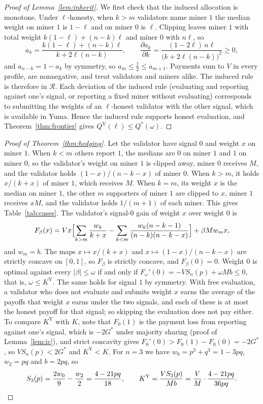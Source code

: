 \documentclass[sigconf,anonymous,review]{acmart}
\numberwithin{equation}{section}
\newcommand{\Gs}{G^{*}}
\newcommand{\KY}{K^{\mathrm{Y}}}
\newcommand{\QY}{Q^{\mathrm{Y}}}
\newcommand{\Rset}{\mathcal{R}}
\begin{document}
\begin{proof}[Proof of Lemma~\ref{lem:inherit}]
We first check that the induced allocation is monotone. Under $\ell$-honesty,
when $k>m$ validators name miner $1$ the median weight on
miner $1$ is $1-\ell$ and on miner $0$ is $\ell$. Clipping leaves miner $1$ with
total weight $k(1-\ell)+(n-k)\ell$ and miner $0$ with $n\ell$, so
\[
a_k=\frac{k(1-\ell)+(n-k)\ell}{k+2\ell(n-k)},\qquad
\frac{\partial a_k}{\partial k}=\frac{(1-2\ell)\,n\ell}{\bigl(k+2\ell(n-k)\bigr)^2}\ge0 ,
\]
and $a_{n-k}=1-a_k$ by symmetry, so $a_m\le\frac12\le a_{m+1}$. Payments sum to
$V$ in every profile, are nonnegative, and treat validators and miners alike.
The induced rule is therefore in $\Rset$. Each deviation of the induced rule
(evaluating and reporting against one's signal, or reporting a fixed miner
without evaluating) corresponds to submitting the weights of an
$\ell$-honest validator with the other signal, which is available in Yuma.
Hence the induced rule supports honest evaluation, and
Theorem~\ref{thm:frontier} gives $\QY(\ell)\le Q^*(\omega)$.
\end{proof}

\begin{proof}[Proof of Theorem~\ref{thm:hedging}]
Let the validator have signal $0$ and weight $x$ on miner $1$. When $k<m$
others report $1$, the medians are $0$ on miner $1$ and $1$ on miner $0$, so
the validator's weight on miner $1$ is clipped away, miner $0$ receives $M$,
and the validator holds $(1-x)/(n-k-x)$ of miner $0$. When $k>m$, it holds
$x/(k+x)$ of miner $1$, which receives $M$. When $k=m$, its weight $x$ is the
median on miner $1$, the other $m$ supporters of miner $1$ are clipped to $x$,
miner $1$ receives $xM$, and the validator holds $1/(m+1)$ of each miner. This
gives Table~\ref{tab:cases}. The validator's signal-$0$ gain of weight $x$ over
weight $0$ is
\[
F_\beta(x)=Vx\Bigl[\sum_{k>m}\frac{w_k}{k+x}-\sum_{k<m}\frac{w_k(n-k-1)}{(n-k)(n-k-x)}\Bigr]+\beta Mw_mx,
\]
and $w_m=b$. The maps $x\mapsto x/(k+x)$ and $x\mapsto(1-x)/(n-k-x)$ are
strictly concave on $[0,1]$, so $F_\beta$ is strictly concave, and $F_\beta(0)=0$.
Weight $0$ is optimal against every $|\beta|\le\omega$ if and only if
$F_\omega'(0)=-VS_n(p)+\omega Mb\le0$, that is, $\omega\le\KY$. The same holds
for signal $1$ by symmetry. With free evaluation, a validator who does not
evaluate and submits weight $x$ earns the average of the payoffs that weight
$x$ earns under the two signals, and each of these is at most the honest payoff
for that signal; so skipping the evaluation does not pay either. To compare
$\KY$ with $K$, note that $F_0(1)$ is the payment loss from reporting against
one's signal, which is
$-2\Gs$ under majority sharing (proof of Lemma~\ref{lem:ic}), and strict
concavity gives $F_0'(0)>F_0(1)-F_0(0)=-2\Gs$, so $VS_n(p)<2\Gs$ and $\KY<K$.
For $n=3$ we have $w_0=p^3+q^3=1-3pq$, $w_2=pq$ and $b=2pq$, so
\[
S_3(p)=\frac{2w_0}{9}-\frac{w_2}{2}=\frac{4-21pq}{18},
\qquad
\KY=\frac{VS_3(p)}{Mb}=\frac VM\cdot\frac{4-21pq}{36pq}.
\qedhere
\]
\end{proof}
\end{document}
